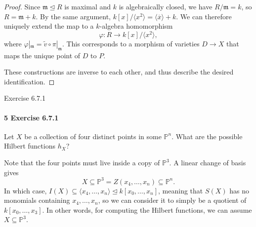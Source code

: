 \documentclass[12pt]{article}
\newlength{\myparskip}
\newenvironment{fullbox}{\begin{lrbox}{\savefullbox}\begin{minipage}{\dimexpr\textwidth-2\fboxsep\relax}\setlength{\parskip}{\myparskip}}{\end{minipage}\end{lrbox}\framebox[\textwidth]{\usebox{\savefullbox}}}
\newenvironment{pbox}[1][]{\begin{fullbox}\ifx#1\empty\else\paragraph{#1}\phantom{}\fi}{\end{fullbox}}
\theoremstyle{definition}
\renewcommand{\P}{\mathbb{P}}
\renewcommand{\phi}{\varphi}
\newcommand{\<}{\langle}
\renewcommand{\>}{\rangle}
\newcommand{\eqc}{\overline}
\newcommand{\teq}{\trianglelefteq}
\newcommand{\mm}{\mathfrak{m}}
\begin{document}
\begin{proof}
    Since $\mm \teq R$ is maximal and $k$ is algebraically closed, we have $R/\mm = k$, so $R = \mm + k$.
    By the same argument, $k[x]/\<x^2\> = \<\eqc{x}\> + k$.
    We can therefore uniquely extend the map to a $k$-algebra homomorphism
    \[
        \phi : R \longrightarrow k[x]/\<x^2\>,
    \]
    where $\phi|_\mm = \tilde{v} \circ \pi|_{\mm}$.
    This corresponds to a morphism of varieties $D \to X$ that maps the unique point of $D$ to $P$.

    These constructions are inverse to each other, and thus describe the desired identification.
\end{proof}




\newpage
\begin{pbox}[5 Exercise 6.7.1]
    Let $X$ be a collection of four distinct points in some $\P^n$.
    What are the possible Hilbert functions $h_X$?
\end{pbox}

Note that the four points must live inside a copy of $\P^3$.
A linear change of basis gives
\[
    X \subseteq \P^3 = Z(x_4, \dots, x_n) \subseteq \P^n.
\]
In which case, $I(X) \subseteq \<x_4, \dots, x_n\> \teq k[x_0, \dots, x_n]$, meaning that $S(X)$ has no monomials containing $x_4, \dots, x_n$, so we can consider it to simply be a quotient of $k[x_0, \dots, x_3]$.
In other words, for computing the Hilbert functions, we can assume $X \subseteq \P^3$.
\end{document}

